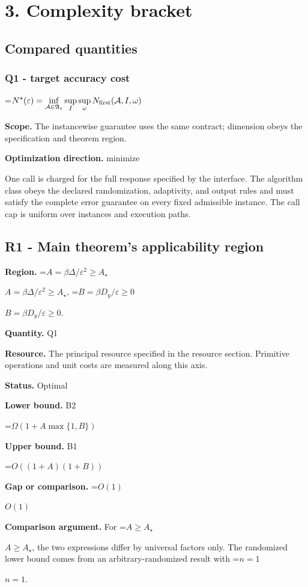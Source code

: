 \documentclass[10pt,a4paper]{article}
\newcommand{\AtlasMath}[1]{\par\begingroup\centering\setbox0=\hbox{$\displaystyle #1$}\ifdim\wd0>1.4\linewidth\typeout{ATLAS WIDE FORMULA: \the\wd0}\fi\ifdim\wd0>\linewidth\resizebox{\linewidth}{!}{\box0}\else\box0\fi\par\endgroup}
\newcommand{\AtlasInlineMath}[1]{\begingroup\setbox0=\hbox{$#1$}\ifdim\wd0>.4\linewidth\endgroup\AtlasMath{#1}\else\endgroup$#1$\fi}
\begin{document}
\section{3. Complexity bracket}
\subsection{Compared quantities}
\subsubsection{Q1 - target accuracy cost}
\AtlasMath{N^\star(\varepsilon)=\inf_{\mathcal A\in\mathfrak A_\varepsilon}\sup_I \sup_\omega N_{\rm first}(\mathcal A,I,\omega)}
\textbf{Scope.} The instancewise guarantee uses the same contract; dimension obeys the specification and theorem region.

\textbf{Optimization direction.} minimize

One call is charged for the full response specified by the interface. The algorithm class obeys the declared randomization, adaptivity, and output rules and must satisfy the complete error guarantee on every fixed admissible instance. The call cap is uniform over instances and execution paths.

\subsection{R1 - Main theorem's applicability region}
\textbf{Region.} \AtlasInlineMath{A=\beta\Delta/\varepsilon^2\ge A_\star}, \AtlasInlineMath{B=\beta D_y/\varepsilon\ge0}.

\textbf{Quantity.} Q1

\textbf{Resource.} The principal resource specified in the resource section. Primitive operations and unit costs are measured along this axis.

\textbf{Status.} Optimal

\textbf{Lower bound.} B2

\AtlasMath{\Omega(1+A\max\{1,B\})}
\textbf{Upper bound.} B1

\AtlasMath{O((1+A)(1+B))}
\textbf{Gap or comparison.} \AtlasInlineMath{O(1)}

\textbf{Comparison argument.} For \AtlasInlineMath{A\ge A_\star}, the two expressions differ by universal factors only. The randomized lower bound comes from an arbitrary-randomized result with \AtlasInlineMath{n=1}.
\end{document}

